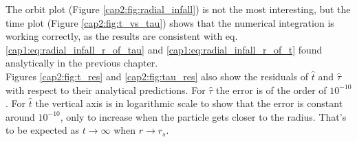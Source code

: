 The orbit plot (Figure \ref{cap2:fig:radial_infall}) is not the most
interesting, but the time plot (Figure \ref{cap2:fig:t_vs_tau}) shows that the
numerical integration is working correctly, as the results are consistent with
eq. \ref{cap1:eq:radial_infall_r_of_tau} and \ref{cap1:eq:radial_infall_r_of_t}
found analytically in the previous chapter. \\
Figures \ref{cap2:fig:t_res} and \ref{cap2:fig:tau_res} also show the residuals
of $\hat t$ and $\hat \tau$ with respect to their analytical predictions.
For $\hat \tau$ the error is of the order of $10^{-10}$.
For $\hat t$ the vertical axis is in logarithmic scale to show that the error is
constant around $10^{-10}$, only to increase when the particle gets closer to
the \Sh radius.
That's to be expected as $t \rightarrow \infty$ when $r \rightarrow r_s$.

